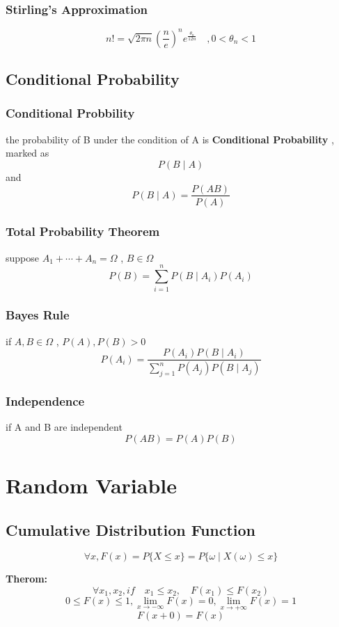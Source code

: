 \documentclass{ctexart}
\begin{document}
\subsubsection{Stirling's Approximation}
\[n!=\sqrt{2\pi n}(\frac{n}{e})^{n}e^{\frac{\theta_{n}}{12n}} \quad ,0<\theta_n <1\]

\vspace{12 pt}
\subsection{Conditional Probability}
\subsubsection{Conditional Probbility}
the probability of B under the condition of A is \textbf{Conditional Probability} , marked as 
\[P(B\mid A)\]
and 
\[P(B\mid A)=\frac{P(AB)}{P(A)}\]

\subsubsection{Total Probability Theorem}
suppose \(A_1+\cdots +A_n=\Omega\) , \(B\in \Omega\)
\[P(B)=\sum^{n}_{i=1}{P(B\mid A_i)P(A_i)}\]

\vspace{12 pt}
\subsubsection{Bayes Rule}
if \(A,B\in \Omega\) , \(P(A),P(B)>0\)
\[P(A_i)=\frac{P(A_i)P(B\mid A_i)}{\sum^{n}_{j=1}{P(A_j)P(B\mid A_j)}}\]

\subsubsection{Independence}
if A and B are independent
\[P(AB)=P(A)P(B)\]

\newpage
\section{Random Variable}
\vspace{12 pt}

\subsection{Cumulative Distribution Function}
\[\forall x,F(x)=P\{X\leq x\}=P\{\omega \mid X(\omega)\leq x\}\]

\textbf{Therom:}
\[\forall x_1,x_2,if\quad x_1\leq x_2,\quad F(x_1)\leq F(x_2)\]
\[0\leq F(x)\leq 1 , \lim_{x \to -\infty}F(x)=0, \lim_{x \to +\infty}F(x)=1\]
\[F(x+0)=F(x)\]
\end{document}
